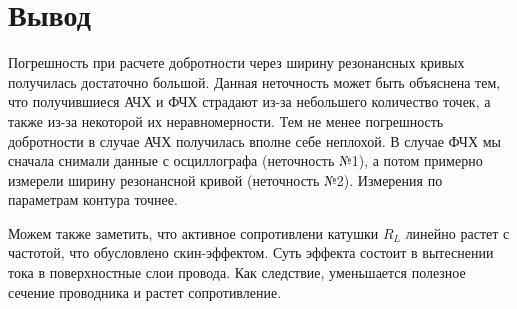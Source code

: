 \documentclass[a4paper, 12pt]{article}
\begin{document}
\section*{Вывод}

Погрешность при расчете добротности через ширину резонансных кривых получилась достаточно большой. Данная неточность может быть объяснена тем, что получившиеся АЧХ и ФЧХ страдают из-за небольшего количество точек, а также из-за некоторой их неравномерности. Тем не менее погрешность добротности в случае АЧХ получилась вполне себе неплохой. В случае ФЧХ мы сначала снимали данные с осциллографа (неточность №1), а потом примерно измерели ширину резонансной кривой (неточность №2). Измерения по параметрам контура точнее.

Можем также заметить, что активное сопротивлени катушки $R_L$ линейно растет с частотой, что обусловлено скин-эффектом. Суть эффекта состоит в вытеснении тока в поверхностные слои провода. Как следствие, уменьшается полезное сечение проводника и растет сопротивление.
\end{document}
